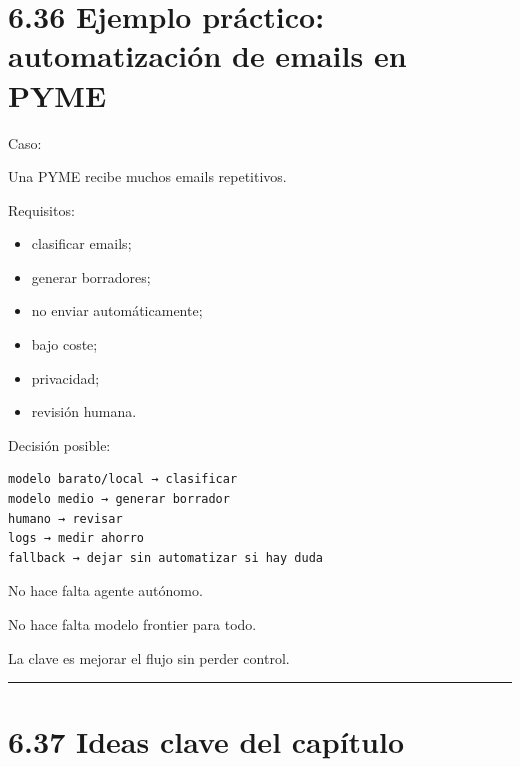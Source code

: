 \section{6.36 Ejemplo práctico: automatización de emails en
PYME}\label{ejemplo-pruxe1ctico-automatizaciuxf3n-de-emails-en-pyme}

Caso:

Una PYME recibe muchos emails repetitivos.

Requisitos:

\begin{itemize}
\tightlist
\item
  clasificar emails;
\item
  generar borradores;
\item
  no enviar automáticamente;
\item
  bajo coste;
\item
  privacidad;
\item
  revisión humana.
\end{itemize}

Decisión posible:

\begin{lstlisting}
modelo barato/local → clasificar
modelo medio → generar borrador
humano → revisar
logs → medir ahorro
fallback → dejar sin automatizar si hay duda
\end{lstlisting}

No hace falta agente autónomo.

No hace falta modelo frontier para todo.

La clave es mejorar el flujo sin perder control.

\begin{center}\rule{0.5\linewidth}{0.5pt}\end{center}

\section{6.37 Ideas clave del
capítulo}\label{ideas-clave-del-capuxedtulo-5}

